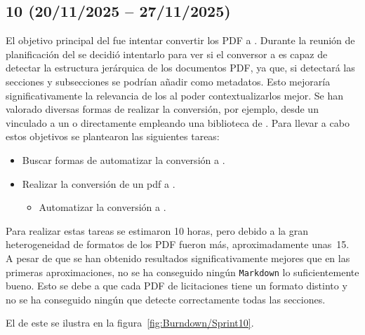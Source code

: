 \subsection{ 10 (20/11/2025 -- 27/11/2025)}
El objetivo principal del  fue intentar convertir los PDF a . Durante la reunión de planificación del  se decidió intentarlo para ver si el conversor a  es capaz de detectar la estructura jerárquica de los documentos PDF, ya que, si detectará las secciones y subsecciones se podrían añadir como metadatos. Esto mejoraría significativamente la relevancia de los  al poder contextualizarlos mejor. Se han valorado diversas formas de realizar la conversión, por ejemplo, desde un  vinculado a un  o directamente empleando una biblioteca de . Para llevar a cabo estos objetivos se plantearon las siguientes tareas:
\begin{itemize}
\tightlist
	\item Buscar formas de automatizar la conversión a .
	\item Realizar la conversión de un pdf a .
	\begin{itemize}
	\tightlist
		\item Automatizar la conversión a .
	\end{itemize}
\end{itemize}

Para realizar estas tareas se estimaron 10 horas, pero debido a la gran heterogeneidad de formatos de los PDF fueron más, aproximadamente unas~15. A pesar de que se han obtenido resultados significativamente mejores que en las primeras aproximaciones, no se ha conseguido ningún \texttt{Markdown} lo suficientemente bueno. Esto se debe a que cada PDF de licitaciones tiene un formato distinto y no se ha conseguido ningún  que detecte correctamente todas las secciones.

El  de este  se ilustra en la figura~\ref{fig:Burndown/Sprint10}.

